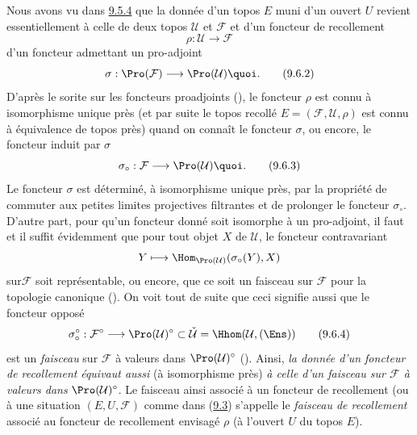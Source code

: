 \documentclass[10pt]{../fichiers-configuration-latex/smfart}
\begin{document}
Nous avons vu dans \hyperref[IV.theo9.5.4]{9.5.4} que la donnée d'un topos $E$
muni d'un ouvert $U$ revient essentiellement à celle de deux topos
$\mathcal{U}$ et $\mathcal{F}$ et d'un foncteur de recollement
\begin{equation*}
\rho:\mathcal{U}\longrightarrow \mathcal{F}\tag{9.6.1}
\end{equation*}
\ie d'un foncteur admettant un pro-adjoint
\begin{equation*}
\sigma:\Pro(\mathcal{F})\longrightarrow
\Pro(\mathcal{U}){\quoi}.\tag{9.6.2}
\end{equation*}
D'après le sorite sur les foncteurs proadjoints (), le
foncteur $\rho$ est connu à isomorphisme unique près (et par suite
le topos recollé $E=(\mathcal{F},\mathcal{U},\rho)$ est connu à
équivalence de topos près) quand on connaît le foncteur $\sigma$, ou
encore, le foncteur induit par $\sigma$
\begin{equation*}
\sigma_{\circ}:\mathcal{F}\longrightarrow
\Pro(\mathcal{U}){\quoi}.\tag{9.6.3}
\end{equation*}
Le foncteur $\sigma$ est déterminé, à isomorphisme unique près, par
la propriété de commuter aux petites limites projectives filtrantes
et de prolonger le foncteur $\sigma_\circ$. D'autre part, pour qu'un
foncteur donné  soit isomorphe à un pro-adjoint, il
faut et il suffit évidemment que pour tout objet $X$ de
$\mathcal{U}$, le foncteur contravariant
$$
Y\longmapsto \Hom_{\Pro(\mathcal{U})}(\sigma_{\circ}(Y),X)
$$
sur\pageoriginale $\mathcal{F}$ soit représentable, ou encore, que
ce soit un faisceau sur $\mathcal{F}$ pour la topologie canonique
(). On voit tout de suite que ceci
signifie aussi que le foncteur opposé
\begin{equation*}
\sigma_{\circ}^{\circ}:\mathcal{F}^{\circ}\longrightarrow
\Pro(\mathcal{U})^{\circ}\subset
\check{\mathcal{U}}=\Hhom(\mathcal{U},(\Ens))\tag{9.6.4}
\end{equation*}
est un \emph{faisceau} sur $\mathcal{F}$ à valeurs dans
$\Pro(\mathcal{U})^{\circ}$ (). Ainsi, \emph{la
donnée d'un foncteur de recollement}  \emph{équivaut
aussi} (à isomorphisme près) \emph{à celle d'un faisceau sur
$\mathcal{F}$ à valeurs dans} $\Pro(\mathcal{U})^{\circ}$. Le
faisceau ainsi associé à un foncteur de recollement (ou à une
situation $(E,U,\mathcal{F})$ comme dans (\hyperref[IV.subsec9.3]{9.3})
s'appelle le \emph{faisceau de recollement} associé au foncteur de
recollement envisagé $\rho$ (\resp à l'ouvert $U$ du topos $E$).
\end{document}
